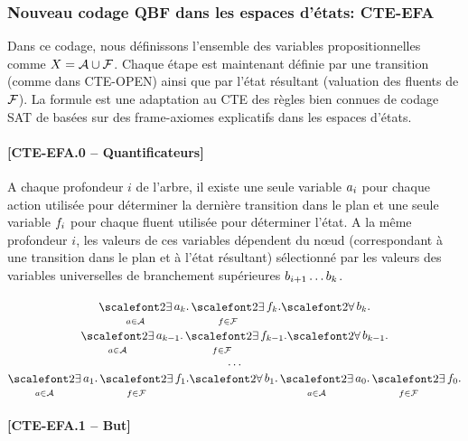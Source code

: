 %
%
\subsubsection{Nouveau codage QBF dans les espaces d'états: CTE-EFA}

Dans ce codage, nous définissons l'ensemble des variables propositionnelles comme $X = \mathcal{A} \cup \mathcal{F}$. Chaque étape est maintenant définie par une transition (comme dans CTE-OPEN) ainsi que par l'état résultant (valuation des fluents de $\mathcal{F}$). La formule est une adaptation au CTE des règles bien connues de codage SAT de \cite{KS92} basées sur des frame-axiomes explicatifs dans les espaces d'états.

\paragraph*{[CTE-EFA.0 -- Quantificateurs]}

A chaque profondeur $i$ de l'arbre, il existe une seule variable $a_{i}$ pour chaque action utilisée pour déterminer la dernière transition dans le plan et une seule variable $f_{i}$ pour chaque fluent utilisée pour déterminer l'état.
A la même profondeur $i$, les valeurs de ces variables dépendent du n\oe ud (correspondant à une transition dans le plan et à l'état résultant) sélectionné par les valeurs des variables universelles de branchement supérieures $b_{i+1}\ldots b_{k}$.

\begin{small}
\[
\begin{matrix}
\displaystyle \bigexists_{\a \in \A} \a_{\depth}. \bigexists_{\f\in \F} \f_{\depth}.%
\displaystyle {\bigforall b_{\depth}.}\\
\displaystyle \bigexists_{\a \in \A} \a_{\depth-1}. \bigexists_{\f\in \F} \f_{\depth-1}.%
\displaystyle {\bigforall b_{\depth-1}.}\\
\displaystyle \dots\\ 
\displaystyle \bigexists_{\a \in \A} \a_{1}. \bigexists_{\f\in \F} \f_{1}.%
\displaystyle {\bigforall b_{1}.}%
\displaystyle \bigexists_{\a \in \A} \a_{0}. \bigexists_{\f\in \F} \f_{0}.
\end{matrix}
\]
\end{small}%

\paragraph*{[CTE-EFA.1 -- But]}

